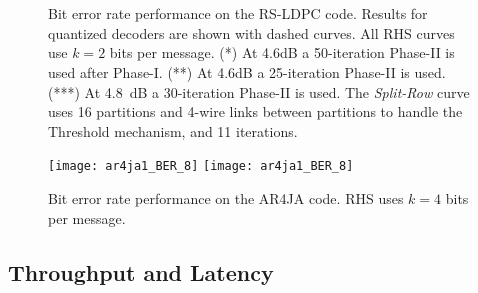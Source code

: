 \documentclass[12pt,journal,twoside,draftcls,onecolumn]{IEEEtran}
\begin{document}
\begin{figure}[tbp]
\begin{center}
\ifCLASSOPTIONdraftcls
	 \\
\else
	 \\
\fi
\caption{{Bit error rate performance on the RS-LDPC code. Results for quantized decoders are shown with dashed curves. All RHS curves use $k=2$ bits per message. (*) At 4.6dB a 50-iteration Phase-II is used after Phase-I. (**) At 4.6dB a 25-iteration Phase-II is used. (***) At 4.8~dB a 30-iteration Phase-II is used.
The \emph{Split-Row} curve \cite{mohsenin:2010} uses 16 partitions and 4-wire links between partitions to handle the Threshold mechanism, and 11 iterations.}}
\end{center}
\end{figure}


\begin{figure}[tbp]
\begin{center}
\ifCLASSOPTIONdraftcls
	\texttt{[image: ar4ja1\_BER\_8]}
\else
	\texttt{[image: ar4ja1\_BER\_8]}
\fi
\caption{Bit error rate performance on the AR4JA code. RHS uses $k=4$ bits per message.}
\label{fig_BERar4ja}
\end{center}
\end{figure}


\subsection{Throughput and Latency}
\label{sect_results::practical}
\end{document}
